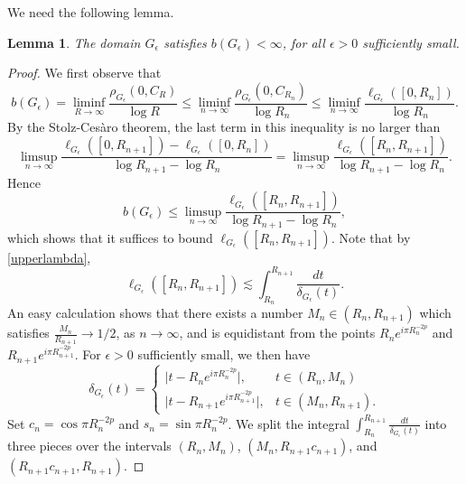 \documentclass[11pt, letterpaper,leqno]{amsart}
\numberwithin{equation}{section}
\newtheorem{lemma}{Lemma}[section]
\theoremstyle{definition}
\begin{document}
We need the following lemma.
\begin{lemma}\label{L1}
The domain $G_\epsilon$ satisfies $b(G_\epsilon)<\infty$, for all $\epsilon>0$ sufficiently small.
\end{lemma}
\begin{proof}
We first observe that 
\[
b(G_\epsilon)=\liminf_{R\to\infty}\frac{\rho_{G_\epsilon}(0,C_R)}{\log R}\leq \liminf_{n\to \infty}\frac{\rho_{G_\epsilon}(0,C_{R_n})}{\log R_n}\leq \liminf_{n\to \infty}\frac{\ell_{G_\epsilon}([0,R_n])}{\log R_n}.
\]
By the Stolz-Ces\`{a}ro theorem, the last term in this inequality is no larger than
\[
\limsup_{n\to \infty}\frac{\ell_{G_\epsilon}([0,R_{n+1}])-\ell_{G_\epsilon}([0,R_n])}{\log R_{n+1}-\log R_n}=\limsup_{n\to \infty}\frac{\ell_{G_\epsilon}([R_n,R_{n+1}])}{\log R_{n+1}-\log R_n}.
\]
Hence
\begin{equation}\label{L1Eq1}
	b(G_\epsilon)\leq \limsup_{n\to \infty}\frac{\ell_{G_\epsilon}([R_n,R_{n+1}])}{\log R_{n+1}-\log R_n},
\end{equation}
which shows that it suffices to bound $\ell_{G_\epsilon}([R_n,R_{n+1}])$. Note that by \eqref{upperlambda},
\[
\ell_{G_\epsilon}([R_n,R_{n+1}]) \lesssim \int_{R_n}^{R_{n+1}}\frac{dt}{\delta_{G_\epsilon}(t)}.
\]
An easy calculation shows that there exists a number $M_n\in (R_n,R_{n+1})$ which satisfies $\frac{M_n}{R_{n+1}}\to 1/2$, as $n\to\infty$, and is equidistant from the points $R_n e^{i\pi R_n^{-2p}}$ and $R_{n+1}e^{i\pi R_{n+1}^{-2p}}$. For $\epsilon>0$ sufficiently small, we then have
\[\delta_{G_\epsilon}(t)= \begin{cases} 
	\big| t-R_n e^{i\pi R_n^{-2p}}\big|, & t\in (R_n,M_n) \\
	\big| t-R_{n+1} e^{i\pi R_{n+1}^{-2p}}\big|, & t\in (M_n,R_{n+1}).
\end{cases}
\]
Set $c_n=\cos\pi R_n^{-2p}$ and $s_n=\sin\pi R_n^{-2p}$. We split the integral $\int_{R_n}^{R_{n+1}}\frac{dt}{\delta_{G_\epsilon}(t)}$ into three pieces over the intervals  $(R_n,M_n)$, $(M_n,R_{n+1}c_{n+1})$,  and \\ $(R_{n+1}c_{n+1},R_{n+1})$.


\end{proof}
\end{document}
